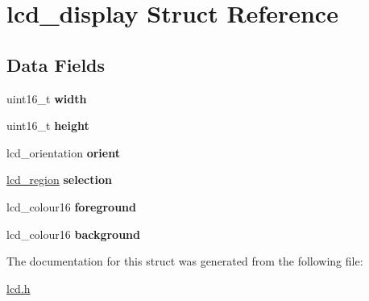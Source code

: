 \hypertarget{structlcd__display}{}\section{lcd\+\_\+display Struct Reference}
\label{structlcd__display}
\subsection*{Data Fields}
\begin{DoxyCompactItemize}
\item 
\hypertarget{structlcd__display_a24ed923482e073440fef7a7e7f659188}{}uint16\+\_\+t {\bfseries width}\label{structlcd__display_a24ed923482e073440fef7a7e7f659188}

\item 
\hypertarget{structlcd__display_ad61bebd332640aa186084cd8f63be31b}{}uint16\+\_\+t {\bfseries height}\label{structlcd__display_ad61bebd332640aa186084cd8f63be31b}

\item 
\hypertarget{structlcd__display_a2111c3f5c53617bfcad35ddf7b753223}{}lcd\+\_\+orientation {\bfseries orient}\label{structlcd__display_a2111c3f5c53617bfcad35ddf7b753223}

\item 
\hypertarget{structlcd__display_a7bf910366a7bd2d9e4b5ac421223805d}{}\hyperlink{structlcd__region}{lcd\+\_\+region} {\bfseries selection}\label{structlcd__display_a7bf910366a7bd2d9e4b5ac421223805d}

\item 
\hypertarget{structlcd__display_a53f84a57e2059db28e433c1d30b07858}{}lcd\+\_\+colour16 {\bfseries foreground}\label{structlcd__display_a53f84a57e2059db28e433c1d30b07858}

\item 
\hypertarget{structlcd__display_a3dc6ef882f8cf45e50d9e99b8499034d}{}lcd\+\_\+colour16 {\bfseries background}\label{structlcd__display_a3dc6ef882f8cf45e50d9e99b8499034d}

\end{DoxyCompactItemize}


The documentation for this struct was generated from the following file\+:\begin{DoxyCompactItemize}
\item 
\hyperlink{lcd_8h}{lcd.\+h}\end{DoxyCompactItemize}
